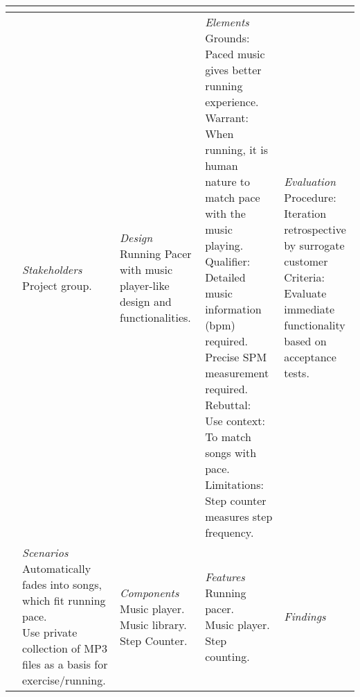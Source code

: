 \begin{table}
\begin{tabular}{l|l|l|l|l}
{   } \\ \hline
\parbox[t][5cm][c]{0.02\textwidth}{}
	& \parbox[t]{0.20\textwidth}{\small 
    \textit{Stakeholders} \newline
    Project group.
	}
	& \parbox[t]{0.20\textwidth}{\small 
		\textit{Design} \newline
	 	Running Pacer with music player-like design and functionalities.  
	}
	& \parbox[t]{0.20\textwidth}{\tiny
		\textit{\small  Elements} \newline
		Grounds: \newline
		Paced music gives better running experience. \newline
		Warrant: \newline
		When running, it is human nature to match pace with the music playing. \newline
		Qualifier: \newline
		Detailed music information (bpm) required. Precise SPM measurement required. \newline
		Rebuttal: \newline
		Use context: \newline
		To match songs with pace. \newline
		Limitations: \newline
		Step counter measures step frequency.
	}
	& \parbox[t]{0.20\textwidth}{\small 
		\textit{Evaluation} \newline
		Procedure: \newline Iteration retrospective by surrogate customer \newline
		Criteria: \newline Evaluate immediate functionality based on acceptance tests.
	}\\ \hline
\parbox[t][3.5cm][c]{0.02\textwidth}{}
	& \parbox[t]{0.20\textwidth}{\small 
		\textit{Scenarios}\newline
		Automatically fades into songs, which fit running pace.\newline
		Use private collection of MP3 files as a basis for exercise/running.
	}
	& \parbox[t]{0.20\textwidth}{\small 
		\textit{Components}\newline
		Music player. \newline
		Music library. \newline
		Step Counter.
		
	}
	& \parbox[t]{0.20\textwidth}{\small 
		\textit{Features}\newline
		Running pacer.\newline
		Music player.\newline
		Step counting.
	}
	& \parbox[t]{0.20\textwidth}{\small 
		\textit{Findings}
	}\\ \hline     
\end{tabular}
\end{table}